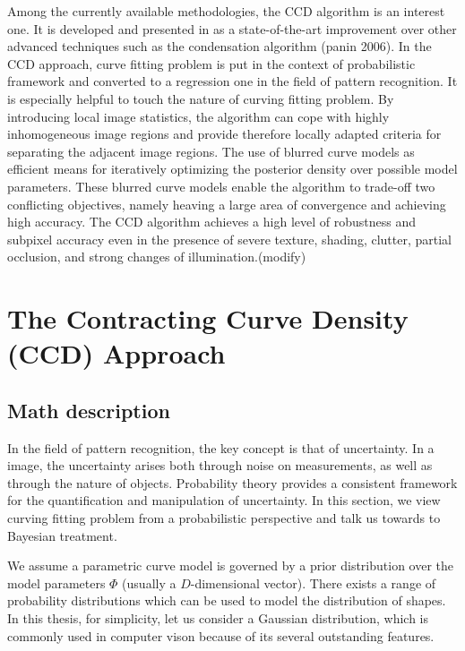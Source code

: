 Among the currently available methodologies, the CCD algorithm is an
interest one. It is developed and presented in as a state-of-the-art
improvement over other advanced techniques such as the condensation
algorithm (panin 2006). In the CCD approach, curve fitting problem is
put in the context of probabilistic framework and converted to a
regression one in the field of pattern recognition. It is especially
helpful to touch the nature of curving fitting problem. By introducing
local image statistics, the algorithm can cope with highly
inhomogeneous image regions and provide therefore locally adapted
criteria for separating the adjacent image regions. The use of blurred
curve models as efficient means for iteratively optimizing the
posterior density over possible model parameters. These blurred curve
models enable the algorithm to trade-off two conflicting objectives,
namely heaving a large area of convergence and achieving high
accuracy. The CCD algorithm achieves a high level of robustness and subpixel
accuracy even in the presence of severe texture, shading, clutter,
partial occlusion, and strong changes of illumination.(modify)



\section{The Contracting Curve Density (CCD) Approach}
\label{sec:sketch}

\subsection{Math description}
\label{sec:md}

In the field of pattern recognition, the key concept is that of
uncertainty. In a image, the uncertainty arises both
through noise on measurements, as well as through the nature of
objects. Probability theory provides a consistent framework for the
quantification and manipulation of uncertainty.  In this section, we
view curving fitting problem from a probabilistic perspective and talk
us towards to Bayesian treatment.

We assume a parametric curve model is governed by a prior distribution
over the model parameters $\Phi$ (usually a $D$-dimensional
vector). There exists a range of probability distributions which can
be used to model the distribution of shapes. In this thesis, for
simplicity, let us consider a Gaussian distribution, which is commonly
used in computer vison because of its several outstanding features.

